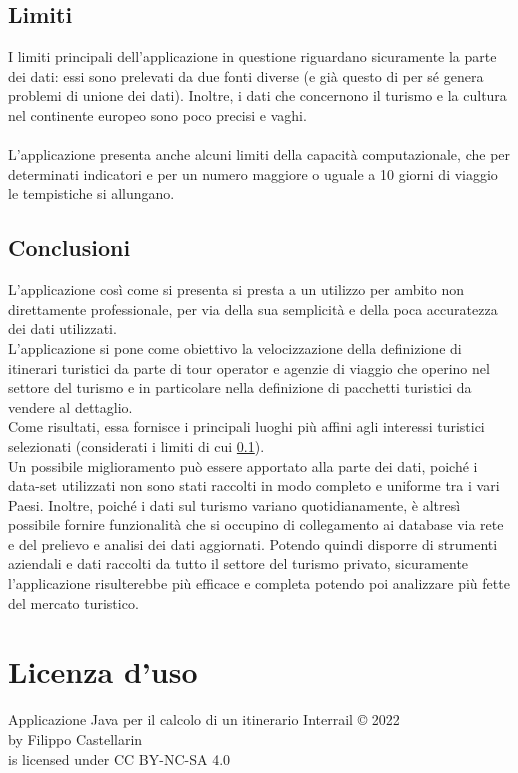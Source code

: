 \documentclass[12pt, a4paper]{article}
\begin{document}
	\subsection{Limiti} \label{lim}
	I limiti principali dell'applicazione in questione riguardano sicuramente la parte dei dati: essi sono prelevati da due fonti diverse (e già questo di per sé genera problemi di unione dei dati). Inoltre, i dati che concernono il turismo e la cultura nel continente europeo sono poco precisi e vaghi.\\\\L'applicazione presenta anche alcuni limiti della capacità computazionale, che per determinati indicatori e per un numero maggiore o uguale a 10 giorni di viaggio le tempistiche si allungano.
	\subsection{Conclusioni}
	L'applicazione così come si presenta si presta a un utilizzo per ambito non direttamente professionale, per via della sua semplicità e della poca accuratezza dei dati utilizzati.\\L'applicazione si pone come obiettivo la velocizzazione della definizione di itinerari turistici da parte di tour operator e agenzie di viaggio che operino nel settore del turismo e in particolare nella definizione di pacchetti turistici da vendere al dettaglio.\\
	Come risultati, essa fornisce i principali luoghi più affini agli interessi turistici selezionati (considerati i limiti di cui \ref{lim}).\\Un possibile miglioramento può essere apportato alla parte dei dati, poiché i data-set utilizzati non sono stati raccolti in modo completo e uniforme tra i vari Paesi. Inoltre, poiché i dati sul turismo variano quotidianamente, è altresì possibile fornire funzionalità che si occupino di collegamento ai database via rete e del prelievo e analisi dei dati aggiornati. Potendo quindi disporre di strumenti aziendali e dati raccolti da tutto il settore del turismo privato, sicuramente l'applicazione risulterebbe più efficace e completa potendo poi analizzare più fette del mercato turistico.
	
	\newpage
	\section{Licenza d'uso}
	\begin{center}
	 Applicazione Java per il calcolo di un itinerario Interrail © 2022\\ by Filippo Castellarin\\ is licensed under CC BY-NC-SA 4.0 
	\end{center}
\end{document}
